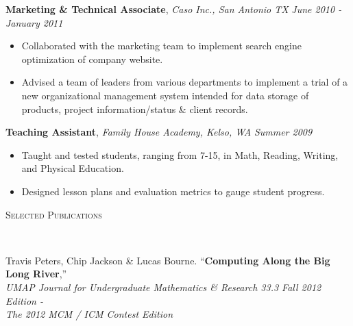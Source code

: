 \documentclass[9pt]{article}
\newenvironment{changemargin}[2]{%
  \begin{list}{}{%
    \setlength{\topsep}{0pt}%
    \setlength{\leftmargin}{#1}%
    \setlength{\rightmargin}{#2}%
    \setlength{\listparindent}{\parindent}%
    \setlength{\itemindent}{\parindent}%
    \setlength{\parsep}{\parskip}%
  }%
  \item[]}{\end{list}
}
\newcommand{\lineover}{
	\begin{changemargin}{-0.05in}{-0.05in}
		\vspace*{-8pt}
		\hrulefill \\
		\vspace*{-2pt}
	\end{changemargin}
}
\newcommand{\header}[1]{
	\begin{changemargin}{-0.5in}{-0.5in}
		\scshape{#1}\\
  		\lineover
	\end{changemargin}
}
\newenvironment{body} {
	\vspace*{-16pt}
	\begin{changemargin}{-0.20in}{-0.5in}
  }	
	{\end{changemargin}
}
\begin{document}
\begin{body}
	\textbf {Marketing \& Technical Associate}, \emph{Caso Inc., San Antonio TX} \hfill \emph{June 2010 - January 2011}\\
	\vspace*{-4pt}
	\begin{itemize} \itemsep -0pt  %
		\item Collaborated with the marketing team to implement search engine optimization of company website.
		\item Advised a team of leaders from various departments to implement a trial of a new organizational management system intended for data storage of products, project information/status \& client records. 
	\end{itemize}

	\textbf {Teaching Assistant}, \emph{Family House Academy, Kelso, WA} \hfill \emph{Summer 2009}\\
	\vspace*{-4pt}
	\begin{itemize} \itemsep -0pt  %
		\item  Taught and tested students, ranging from 7-15, in Math, Reading, Writing, and Physical Education. 
		\item Designed lesson plans and evaluation metrics to gauge student progress. 
	\end{itemize}

\end{body}

\smallskip


\header{Selected Publications}

\begin{body}
	\vspace{14pt}
	Travis Peters, Chip Jackson \& Lucas Bourne. ``\textbf{Computing Along the Big Long River},'' \\
	\emph{UMAP Journal for Undergraduate Mathematics \& Research 33.3 Fall 2012 Edition - \\ 
	\hspace{5mm} The 2012 MCM / ICM Contest Edition}\\
\end{body}

\smallskip

\end{document}
